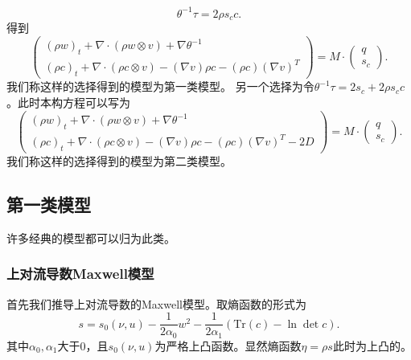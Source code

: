 	\begin{equation*}
		\theta^{-1} \tau = 2 \rho s_c c.
	\end{equation*}
	得到
	\begin{equation} \label{eq:ECDFgeneral1}
		\left( \begin{array}{c} 
			(\rho w)_t +  \nabla \cdot (\rho w \otimes v)  + \nabla \theta^{-1} \\
			(\rho c)_t +  \nabla \cdot (\rho c \otimes v) - (\nabla v) \rho c - (\rho c) (\nabla v)^T 
		\end{array} \right) = M \cdot
		\left( \begin{array}{c} 
			q \\ s_c
		\end{array}\right).
	\end{equation}
	我们称这样的选择得到的模型为第一类模型。
	另一个选择为令$\theta^{-1} \tau = 2 s_c + 2 \rho s_c c$。此时本构方程可以写为
	\begin{equation}
	\left( \begin{array}{c} 
			(\rho w)_t +  \nabla \cdot (\rho w \otimes v)  + \nabla \theta^{-1} \\
			(\rho c)_t +  \nabla \cdot (\rho c \otimes v) - (\nabla v) \rho c - (\rho c) (\nabla v)^T - 2 D 
		\end{array} \right) = M \cdot
		\left( \begin{array}{c} 
			q \\ s_c
		\end{array}\right).	
	\end{equation}
	我们称这样的选择得到的模型为第二类模型。

	\subsection{第一类模型}
	许多经典的模型都可以归为此类。
	\subsubsection{上对流导数Maxwell模型}
	首先我们推导上对流导数的Maxwell模型。取熵函数的形式为
	\begin{equation*}
			s = s_0(\nu,u)  - \frac{1}{2  \alpha_0} w^2 - \frac{1}{2  \alpha_1} (\mbox{Tr}(c) - \ln \det c).
	\end{equation*}
	其中$\alpha_0,\alpha_1$大于$0$，且$s_0(\nu,u)$为严格上凸函数。显然熵函数$\eta = \rho s$此时为上凸的。
	

